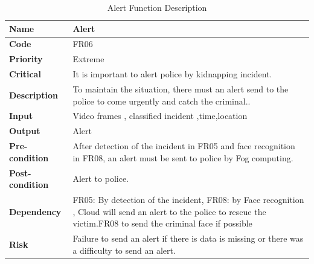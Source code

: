 \documentclass[12pt]{article}
\begin{document}
\begin{table}[h!]
\caption{Alert Function Description}
\begin{tabular}{|p{}|p{}|}
\hline
\textbf{Name}           & Alert  \\ \hline
\textbf{Code}           & FR06 \\ \hline
\textbf{Priority}       & Extreme  \\ \hline
\textbf{Critical}       & It is important to alert police by kidnapping incident. \\ \hline
\textbf{Description}    & To maintain the situation, there must an alert send to the police to come urgently and catch the criminal.. \\ \hline
\textbf{Input}          & Video frames , classified incident ,time,location                                               \\ \hline
\textbf{Output}         & Alert                             
\\ \hline
\textbf{Pre-condition}  & After detection of the incident in FR05 and face recognition in FR08, an alert must be sent to police by Fog computing.                      \\ \hline                                                                                     
\textbf{Post-condition} & Alert to police.      \\ \hline
\textbf{Dependency}     & 
FR05: By detection of the incident,  FR08: by Face recognition , Cloud will send an alert to the police to rescue the victim.FR08 to send the criminal face if possible
\\ \hline
\textbf{Risk}   & Failure to send an alert if there is data is missing or there was a difficulty to send an alert. \\ \hline
\end{tabular}
\end{table} 
 \FloatBarrier
\end{document}
